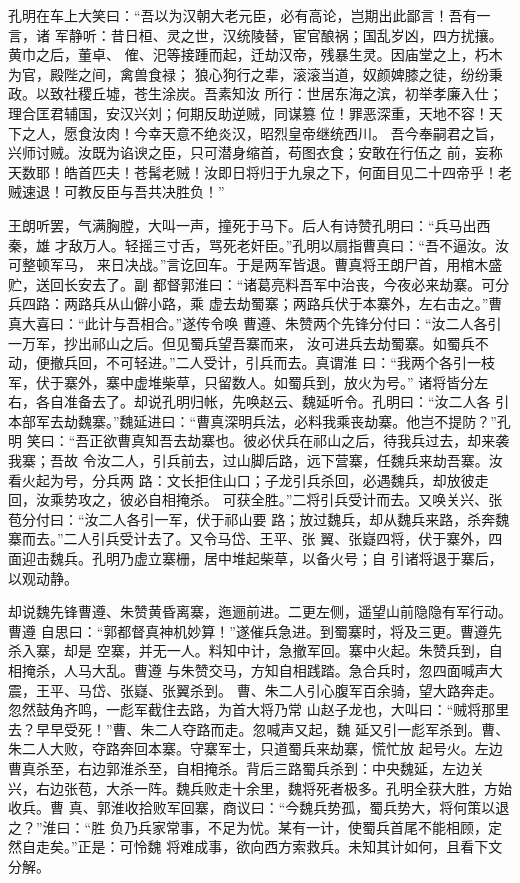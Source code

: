 孔明在车上大笑曰：“吾以为汉朝大老元臣，必有高论，岂期出此鄙言！吾有一言，诸
军静听：昔日桓、灵之世，汉统陵替，宦官酿祸；国乱岁凶，四方扰攘。黄巾之后，董卓、
傕、汜等接踵而起，迁劫汉帝，残暴生灵。因庙堂之上，朽木为官，殿陛之间，禽兽食禄；
狼心狗行之辈，滚滚当道，奴颜婢膝之徒，纷纷秉政。以致社稷丘墟，苍生涂炭。吾素知汝
所行：世居东海之滨，初举孝廉入仕；理合匡君辅国，安汉兴刘；何期反助逆贼，同谋篡
位！罪恶深重，天地不容！天下之人，愿食汝肉！今幸天意不绝炎汉，昭烈皇帝继统西川。
吾今奉嗣君之旨，兴师讨贼。汝既为谄谀之臣，只可潜身缩首，苟图衣食；安敢在行伍之
前，妄称天数耶！皓首匹夫！苍髯老贼！汝即日将归于九泉之下，何面目见二十四帝乎！老
贼速退！可教反臣与吾共决胜负！”

王朗听罢，气满胸膛，大叫一声，撞死于马下。后人有诗赞孔明曰：“兵马出西秦，雄
才敌万人。轻摇三寸舌，骂死老奸臣。”孔明以扇指曹真曰：“吾不逼汝。汝可整顿军马，
来日决战。”言讫回车。于是两军皆退。曹真将王朗尸首，用棺木盛贮，送回长安去了。副
都督郭淮曰：“诸葛亮料吾军中治丧，今夜必来劫寨。可分兵四路：两路兵从山僻小路，乘
虚去劫蜀寨；两路兵伏于本寨外，左右击之。”曹真大喜曰：“此计与吾相合。”遂传令唤
曹遵、朱赞两个先锋分付曰：“汝二人各引一万军，抄出祁山之后。但见蜀兵望吾寨而来，
汝可进兵去劫蜀寨。如蜀兵不动，便撤兵回，不可轻进。”二人受计，引兵而去。真谓淮
曰：“我两个各引一枝军，伏于寨外，寨中虚堆柴草，只留数人。如蜀兵到，放火为号。”
诸将皆分左右，各自准备去了。却说孔明归帐，先唤赵云、魏延听令。孔明曰：“汝二人各
引本部军去劫魏寨。”魏延进曰：“曹真深明兵法，必料我乘丧劫寨。他岂不提防？”孔明
笑曰：“吾正欲曹真知吾去劫寨也。彼必伏兵在祁山之后，待我兵过去，却来袭我寨；吾故
令汝二人，引兵前去，过山脚后路，远下营寨，任魏兵来劫吾寨。汝看火起为号，分兵两
路：文长拒住山口；子龙引兵杀回，必遇魏兵，却放彼走回，汝乘势攻之，彼必自相掩杀。
可获全胜。”二将引兵受计而去。又唤关兴、张苞分付曰：“汝二人各引一军，伏于祁山要
路；放过魏兵，却从魏兵来路，杀奔魏寨而去。”二人引兵受计去了。又令马岱、王平、张
翼、张嶷四将，伏于寨外，四面迎击魏兵。孔明乃虚立寨栅，居中堆起柴草，以备火号；自
引诸将退于寨后，以观动静。

却说魏先锋曹遵、朱赞黄昏离寨，迤逦前进。二更左侧，遥望山前隐隐有军行动。曹遵
自思曰：“郭都督真神机妙算！”遂催兵急进。到蜀寨时，将及三更。曹遵先杀入寨，却是
空寨，并无一人。料知中计，急撤军回。寨中火起。朱赞兵到，自相掩杀，人马大乱。曹遵
与朱赞交马，方知自相践踏。急合兵时，忽四面喊声大震，王平、马岱、张嶷、张翼杀到。
曹、朱二人引心腹军百余骑，望大路奔走。忽然鼓角齐鸣，一彪军截住去路，为首大将乃常
山赵子龙也，大叫曰：“贼将那里去？早早受死！”曹、朱二人夺路而走。忽喊声又起，魏
延又引一彪军杀到。曹、朱二人大败，夺路奔回本寨。守寨军士，只道蜀兵来劫寨，慌忙放
起号火。左边曹真杀至，右边郭淮杀至，自相掩杀。背后三路蜀兵杀到：中央魏延，左边关
兴，右边张苞，大杀一阵。魏兵败走十余里，魏将死者极多。孔明全获大胜，方始收兵。曹
真、郭淮收拾败军回寨，商议曰：“今魏兵势孤，蜀兵势大，将何策以退之？”淮曰：“胜
负乃兵家常事，不足为忧。某有一计，使蜀兵首尾不能相顾，定然自走矣。”正是：可怜魏
将难成事，欲向西方索救兵。未知其计如何，且看下文分解。